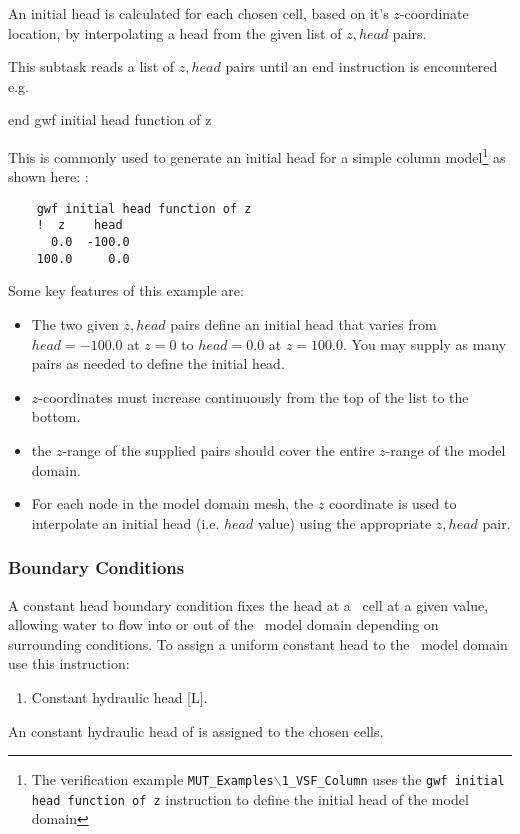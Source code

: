 {{     An initial head is calculated for each chosen cell, based on it's $z$-coordinate location, by interpolating a head from the given list of  $z, head$ pairs.

     This subtask reads a list of $z, head$ pairs until an \textsf{end} instruction is encountered e.g.\:

    {\Large \sf end gwf initial head function of z}
    }

This is commonly used to generate an initial head for a simple column model\footnote{The verification example \texttt{MUT\_Examples$\backslash$1\_VSF\_Column} uses the \texttt{gwf initial head function of z} instruction to define the initial head of the model domain} as shown here: :
\begin{verbatim}
    gwf initial head function of z
    !  z    head
      0.0  -100.0
    100.0     0.0
\end{verbatim}
Some key features of this example are:
\begin{itemize}
  \item The two given $z,head$ pairs define an initial head  that varies from $head=-100.0$ at $z=0$ to $head=0.0$ at $z=100.0$.  You may supply as many pairs as needed to define the initial head.
  \item $z$-coordinates must increase continuously from the top of the list to the bottom.
  \item the $z$-range of the supplied pairs should cover the entire $z$-range of the model domain.
  \item For each node in the model domain  mesh, the $z$ coordinate is used to interpolate an initial head (i.e. $head$ value) using the appropriate $z, head$ pair.
\end{itemize}

\subsubsection{Boundary Conditions}  
A constant head boundary condition fixes the head at a \gwf\ cell at a given value, allowing water to flow into or out of the \gwf\ model domain depending on surrounding conditions.    To assign a uniform constant head to the \gwf\ model domain use this instruction:

    {
        \squish
        \begin{enumerate}
        \item {}  Constant hydraulic head [L].
        \end{enumerate}
          An constant hydraulic head  of  is assigned to the chosen cells.
    }

}
